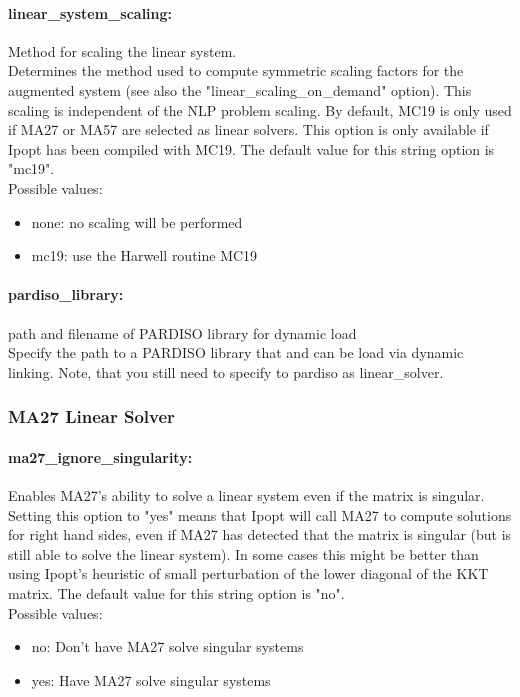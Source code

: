\paragraph{linear\_system\_scaling:}\label{sec:linear_system_scaling} Method for scaling the linear system. $\;$ \\
 Determines the method used to compute symmetric
scaling factors for the augmented system (see
also the "linear\_scaling\_on\_demand" option). 
This scaling is independent of the NLP problem
scaling.  By default, MC19 is only used if MA27
or MA57 are selected as linear solvers. This
option is only available if Ipopt has been
compiled with MC19.
The default value for this string option is "mc19".
\\ 
Possible values:
\begin{itemize}
   \item none: no scaling will be performed
   \item mc19: use the Harwell routine MC19
\end{itemize}

\paragraph{pardiso\_library:}\label{sec:pardiso_library} path and filename of PARDISO library for dynamic load $\;$ \\
 Specify the path to a PARDISO library that and
can be load via dynamic linking. Note, that you
still need to specify to pardiso as
linear\_solver.

\subsubsection{MA27 Linear Solver}
\label{sec:MA27_Linear_Solver}

\paragraph{ma27\_ignore\_singularity:}\label{sec:ma27_ignore_singularity} Enables MA27's ability to solve a linear system even if the matrix is singular. $\;$ \\
 Setting this option to "yes" means that Ipopt
will call MA27 to compute solutions for right
hand sides, even if MA27 has detected that the
matrix is singular (but is still able to solve
the linear system). In some cases this might be
better than using Ipopt's heuristic of small
perturbation of the lower diagonal of the KKT
matrix.
The default value for this string option is "no".
\\ 
Possible values:
\begin{itemize}
   \item no: Don't have MA27 solve singular systems
   \item yes: Have MA27 solve singular systems
\end{itemize}

